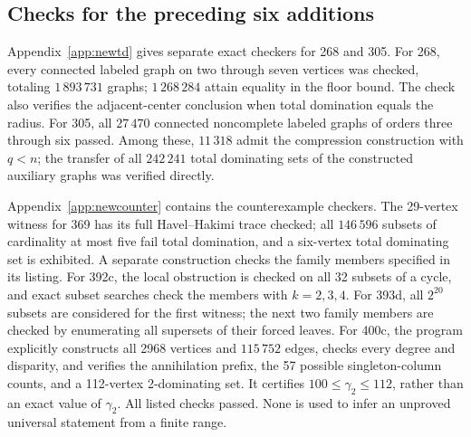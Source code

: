 \documentclass[11pt,a4paper]{article}
\theoremstyle{remark}
\begin{document}
\subsection{Checks for the preceding six additions}
Appendix~\ref{app:newtd} gives separate exact checkers for 268 and 305.
For 268, every connected labeled graph on two through seven vertices
was checked, totaling $1\,893\,731$ graphs; $1\,268\,284$ attain equality
in the floor bound. The check also verifies the adjacent-center conclusion
when total domination equals the radius.
For 305, all $27\,470$ connected noncomplete labeled graphs of orders
three through six passed. Among these, $11\,318$ admit the compression
construction with $q<n$; the transfer of all $242\,241$ total dominating
sets of the constructed auxiliary graphs was verified directly.

Appendix~\ref{app:newcounter} contains the counterexample checkers.
The 29-vertex witness for 369 has its full Havel--Hakimi trace checked;
all $146\,596$ subsets of cardinality at most five fail total domination,
and a six-vertex total dominating set is exhibited. A separate construction
checks the family members specified in its listing.
For 392c, the local obstruction is checked on all 32 subsets of a cycle,
and exact subset searches check the members with $k=2,3,4$.
For 393d, all $2^{20}$ subsets are considered for the first witness;
the next two family members are checked by enumerating all supersets
of their forced leaves.
For 400c, the program explicitly constructs all 2968 vertices and
$115\,752$ edges, checks every degree and disparity, and verifies the
annihilation prefix, the 57 possible singleton-column counts, and a
112-vertex 2-dominating set. It certifies
$100\le\gamma_2\le112$, rather than an exact value of $\gamma_2$.
All listed checks passed. None is used to infer an unproved universal
statement from a finite range.
\end{document}
